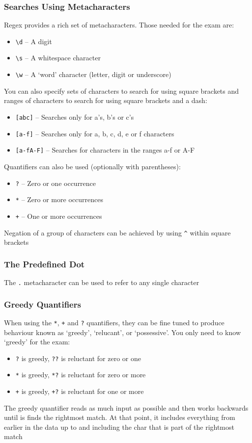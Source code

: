 \subsubsection{Searches Using Metacharacters}
Regex provides a rich set of metacharacters. Those needed for the exam are:
\begin{itemize}
    \item \verb#\d# -- A digit
    \item \verb#\s# -- A whitespace character
    \item \verb#\w# -- A `word' character (letter, digit or underscore)
\end{itemize}
You can also specify sets of characters to search for using square brackets and 
ranges of characters to search for using square brackets and a dash:
\begin{itemize}
    \item \verb#[abc]# -- Searches only for a's, b's or c's
    \item \verb#[a-f]# -- Searches only for a, b, c, d, e or f characters
    \item \verb#[a-fA-F]# -- Searches for characters in the ranges a-f or A-F
\end{itemize}
Quantifiers can also be used (optionally with parentheses):
\begin{itemize}
    \item \verb#?# -- Zero or one occurrence
    \item \verb#*# -- Zero or more occurrences
    \item \verb#+# -- One or more occurrences
\end{itemize}
Negation of a group of characters can be achieved by using \verb#^# within 
square brackets

\subsubsection{The Predefined Dot}
The \verb#.# metacharacter can be used to refer to any single character

\subsubsection{Greedy Quantifiers}
When using the \verb#*#, \verb#+# and \verb#?# quantifiers, they can be fine 
tuned to produce behaviour known as `greedy', `relucant', or `possessive'. You 
only need to know `greedy' for the exam:
\begin{itemize}
    \item \verb#?# is greedy, \verb#??# is reluctant for zero or one
    \item \verb#*# is greedy, \verb#*?# is reluctant for zero or more
    \item \verb#+# is greedy, \verb#+?# is reluctant for one or more
\end{itemize}
The greedy quantifier reads as much input as possible and then works backwards 
until is finds the rightmost match. At that point, it includes everything from 
earlier in the data up to and including the char that is part of the rightmost 
match


